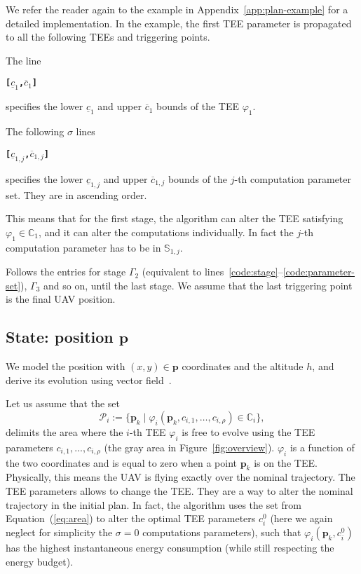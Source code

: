 \documentclass[letterpaper,10pt,conference]{ieeeconf}
\theoremstyle{definition}
\begin{document}
We refer the reader again to the example in Appendix~\ref{app:plan-example} for a detailed implementation. In the example, the first TEE parameter is propagated to all the following TEEs and triggering points. 

The line
\begin{algorithmic}[1]
  \State\textbf{\texttt{[$\underline{c}_1$,$\overline{c}_1$]}}\label{code:tee-set}
\end{algorithmic}
specifies the lower $\underline{c}_{1}$ and upper $\overline{c}_{1}$ bounds of the TEE $\varphi_1$.

The following $\sigma$ lines
\begin{algorithmic}[1]
  \State\textbf{\texttt{[$\underline{c}_{1,j}$,$\overline{c}_{1,j}$]}}\label{code:parameter-set}
\end{algorithmic}
specifies the lower $\underline{c}_{1,j}$ and upper $\overline{c}_{1,j}$ bounds of the $j$-th computation parameter set. They are in ascending order. 

This means that for the first stage, the algorithm can alter the TEE satisfying $\varphi_1\in\mathbb{C}_1$, and it can alter the computations individually. In fact the $j$-th computation parameter has to be in $\mathbb{S}_{1,j}$.

Follows the entries for stage $\Gamma_2$ (equivalent to lines~\ref{code:stage}--\ref{code:parameter-set}), $\Gamma_3$ and so on, until the last stage. We assume that the last triggering point is the final UAV position.

\subsection{State: position $\mathbf{p}$}
\label{sec:model}

We model the position with $(x,y)\in\mathbf{p}$ coordinates and the altitude $h$, and derive its evolution using vector field~\cite{de2017guidance}.

Let us assume that the set
\begin{equation}\label{eq:area}
  \mathcal{P}_i:=\{\mathbf{p}_k\mid\varphi_i(\mathbf{p}_k,c_{i,1},\dots,c_{i,\rho})\in\mathbb{C}_i\},
\end{equation}
delimits the area where the $i$-th TEE $\varphi_i$ is free to evolve using the TEE parameters $c_{i,1},...,c_{i,\rho}$ (the gray area in Figure~\ref{fig:overview}). $\varphi_i$ is a function of the two coordinates and is equal to zero when a point $\mathbf{p}_k$ is on the TEE. Physically, this means the UAV is flying exactly over the nominal trajectory. The TEE parameters allows to change the TEE. They are a way to alter the nominal trajectory in the initial plan.
In fact, the algorithm uses the set from Equation~(\ref{eq:area}) to alter the optimal TEE parameters $c_i^0$ (here we again neglect for simplicity the $\sigma=0$ computations parameters), such that $\varphi_i(\mathbf{p}_k,c_i^0)$ has the highest instantaneous energy consumption (while still respecting the energy budget). 
\end{document}
